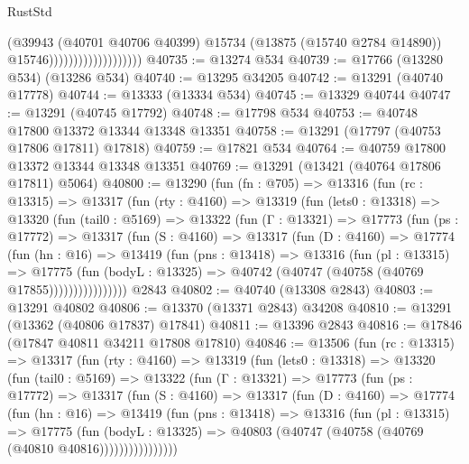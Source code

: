 \begin{lexlean}{RustStd}
\begin{coremodule}
                                        (@39943
                                          (@40701 @40706 @40399)
                                          @15734
                                          (@13875 (@15740 @2784 @14890))
                                          @15746)))))))))))))))))))
@40735 := @13274 @534
@40739 := @17766 (@13280 @534) (@13286 @534)
@40740 := @13295 @34205
@40742 := @13291 (@40740 @17778)
@40744 := @13333 (@13334 @534)
@40745 := @13329 @40744
@40747 := @13291 (@40745 @17792)
@40748 := @17798 @534
@40753 := @40748 @17800 @13372 @13344 @13348 @13351
@40758 := @13291 (@17797 (@40753 @17806 @17811) @17818)
@40759 := @17821 @534
@40764 := @40759 @17800 @13372 @13344 @13348 @13351
@40769 := @13291 (@13421 (@40764 @17806 @17811) @5064)
@40800 := @13290
    (fun (fn : @705) =>
    @13316
      (fun (rc : @13315) =>
      @13317
        (fun (rty : @4160) =>
        @13319
          (fun (lets0 : @13318) =>
          @13320
            (fun (tail0 : @5169) =>
            @13322
              (fun (Γ : @13321) =>
              @17773
                (fun (ps : @17772) =>
                @13317
                  (fun (S : @4160) =>
                  @13317
                    (fun (D : @4160) =>
                    @17774
                      (fun (hn : @16) =>
                      @13419
                        (fun (pns : @13418) =>
                        @13316
                          (fun (pl : @13315) =>
                          @17775
                            (fun (bodyL : @13325) =>
                            @40742 (@40747 (@40758 (@40769 @17855))))))))))))))))
    @2843
@40802 := @40740 (@13308 @2843)
@40803 := @13291 @40802
@40806 := @13370 (@13371 @2843) @34208
@40810 := @13291 (@13362 (@40806 @17837) @17841)
@40811 := @13396 @2843
@40816 := @17846 (@17847 @40811 @34211 @17808 @17810)
@40846 := @13506
    (fun (rc : @13315) =>
    @13317
      (fun (rty : @4160) =>
      @13319
        (fun (lets0 : @13318) =>
        @13320
          (fun (tail0 : @5169) =>
          @13322
            (fun (Γ : @13321) =>
            @17773
              (fun (ps : @17772) =>
              @13317
                (fun (S : @4160) =>
                @13317
                  (fun (D : @4160) =>
                  @17774
                    (fun (hn : @16) =>
                    @13419
                      (fun (pns : @13418) =>
                      @13316
                        (fun (pl : @13315) =>
                        @17775
                          (fun (bodyL : @13325) =>
                          @40803 (@40747 (@40758 (@40769 (@40810 @40816))))))))))))))))

\end{coremodule}
\end{lexlean}
